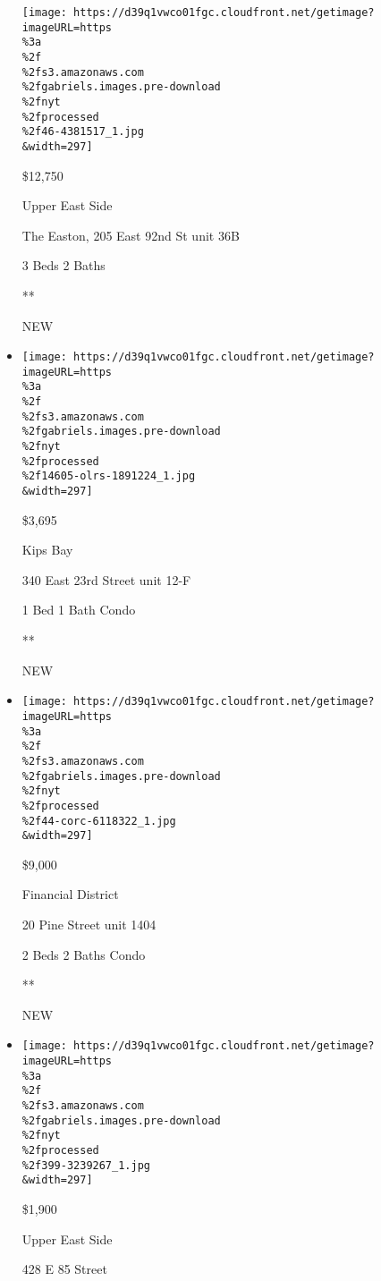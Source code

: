 \begin{itemize}
  \texttt{[image: https://d39q1vwco01fgc.cloudfront.net/getimage?imageURL=https\\\%3a\\\%2f\\\%2fs3.amazonaws.com\\\%2fgabriels.images.pre-download\\\%2fnyt\\\%2fprocessed\\\%2f46-4381517\_1.jpg\\\&width=297]}

  \$12,750

  Upper East Side

  The Easton, 205 East 92nd St unit 36B

  3 Beds \textbar{} 2 Baths \textbar{}

  **

  NEW
\item
  \href{/real-estate/usa/ny/new-york/kips-bay/homes-for-rent/340-east-23rd-street/14605-OLRS-1891224?}{}

  \texttt{[image: https://d39q1vwco01fgc.cloudfront.net/getimage?imageURL=https\\\%3a\\\%2f\\\%2fs3.amazonaws.com\\\%2fgabriels.images.pre-download\\\%2fnyt\\\%2fprocessed\\\%2f14605-olrs-1891224\_1.jpg\\\&width=297]}

  \$3,695

  Kips Bay

  340 East 23rd Street unit 12-F

  1 Bed \textbar{} 1 Bath \textbar{} Condo

  **

  NEW
\item
  \href{/real-estate/usa/ny/new-york/financial-district/homes-for-rent/20-pine-street/44-CORC-6118322?}{}

  \texttt{[image: https://d39q1vwco01fgc.cloudfront.net/getimage?imageURL=https\\\%3a\\\%2f\\\%2fs3.amazonaws.com\\\%2fgabriels.images.pre-download\\\%2fnyt\\\%2fprocessed\\\%2f44-corc-6118322\_1.jpg\\\&width=297]}

  \$9,000

  Financial District

  20 Pine Street unit 1404

  2 Beds \textbar{} 2 Baths \textbar{} Condo

  **

  NEW
\item
  \href{/real-estate/usa/ny/new-york/upper-east-side/homes-for-rent/428-e-85-street/399-3239267?}{}

  \texttt{[image: https://d39q1vwco01fgc.cloudfront.net/getimage?imageURL=https\\\%3a\\\%2f\\\%2fs3.amazonaws.com\\\%2fgabriels.images.pre-download\\\%2fnyt\\\%2fprocessed\\\%2f399-3239267\_1.jpg\\\&width=297]}

  \$1,900

  Upper East Side

  428 E 85 Street


\end{itemize}
